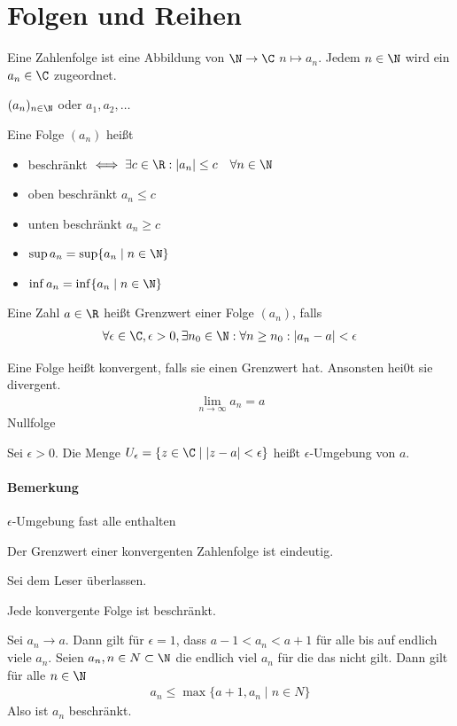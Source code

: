 \section{Folgen und Reihen}
\begin{definition}[Zahlenfolge]
	Eine Zahlenfolge ist eine Abbildung von $\N \to \C$ $n\mapsto a_n$. Jedem $n \in \N$ wird ein $a_n \in \C$ zugeordnet.
\end{definition}
$(a_n)_{n\in \N}$ oder $a_1, a_2, \dots$
\begin{definition}
	Eine Folge $(a_n)$ heißt
	\begin{itemize}
		\item beschränkt $\iff \exists c\in \R: |a_n|\leq c\quad \forall n \in \N$
		\item oben beschränkt $a_n\leq c$
		\item unten beschränkt $a_n \geq c$
		\item $\sup a_n = \sup\{a_n\mid n\in \N\}$
		\item $\inf a_n = \inf\{a_n\mid n\in \N\}$
	\end{itemize}
\end{definition}
\begin{definition}
	Eine Zahl $a \in \R$ heißt Grenzwert einer Folge $(a_n)$, falls 
	\begin{align*}
		\forall \epsilon \in \C, \epsilon > 0, \exists n_0 \in \N: \forall n \geq n_0: |a_n-a|<\epsilon 
	\end{align*}
\end{definition}
Eine Folge heißt konvergent, falls sie einen Grenzwert hat. Ansonsten hei0t sie divergent.
\begin{align*}
	\lim_{n\to \infty} a_n = a
\end{align*}
Nullfolge
\begin{definition}
	Sei $\epsilon>0$. Die Menge $U_{\epsilon}=\{z\in \C\mid |z-a| < \epsilon\}$ heißt $\epsilon$-Umgebung von $a$.
\end{definition}
\paragraph{Bemerkung} $\epsilon$-Umgebung fast alle enthalten
\begin{theorem}
	Der Grenzwert einer konvergenten Zahlenfolge ist eindeutig.
\end{theorem}
\prove Sei dem Leser überlassen.
\begin{theorem}
	Jede konvergente Folge ist beschränkt.
\end{theorem}
\prove Sei $a_n \to a$. Dann gilt für $\epsilon=1$, dass $a-1<a_n<a+1$ für alle bis auf endlich viele $a_n$. Seien $a_n, n\in N\subset \N$ die endlich viel $a_n$ für die das nicht gilt. Dann gilt für alle $n\in \N$
\begin{align*}
	a_n \leq \max\{a+1,a_n\mid n\in N\}
\end{align*}
Also ist $a_n$ beschränkt.
